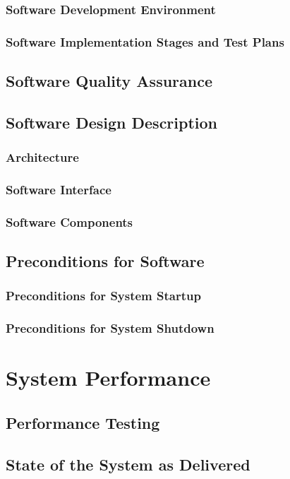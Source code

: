 \documentclass[10pt,a4paper]{report}
\begin{document}
\subsection{Software Development Environment}
\subsection{Software Implementation Stages and Test Plans}

\section{Software Quality Assurance}

\section{Software Design Description}
\subsection{Architecture}
\subsection{Software Interface}
\subsection{Software Components}

\section{Preconditions for Software}
\subsection{Preconditions for System Startup}
\subsection{Preconditions for System Shutdown}

\chapter{System Performance}
\section{Performance Testing}
\section{State of the System as Delivered}
\end{document}
